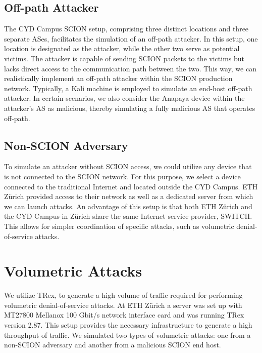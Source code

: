\subsection{Off-path Attacker}

The CYD Campus SCION setup, comprising three distinct locations and three separate ASes, facilitates the simulation of an off-path attacker.
In this setup, one location is designated as the attacker, while the other two serve as potential victims.
The attacker is capable of sending SCION packets to the victims but lacks direct access to the communication path between the two.
This way, we can realistically implement an off-path attacker within the SCION production network.
Typically, a Kali machine is employed to simulate an end-host off-path attacker.
In certain scenarios, we also consider the Anapaya device within the attacker's AS as malicious, thereby simulating a fully malicious AS that operates off-path.

\subsection{Non-SCION Adversary}
To simulate an attacker without SCION access, we could utilize any device that is not connected to the SCION network.
For this purpose, we select a device connected to the traditional Internet and located outside the CYD Campus.
ETH Zürich provided access to their network as well as a dedicated server from which we can launch attacks.
An advantage of this setup is that both ETH Zürich and the CYD Campus in Zürich share the same Internet service provider, SWITCH.
This allows for simpler coordination of specific attacks, such as volumetric denial-of-service attacks.


\section{Volumetric Attacks}
\label{sec:impl:VolumetricDoS}

We utilize TRex, to generate a high volume of traffic required for performing volumetric denial-of-service attacks.
At ETH Zürich a server was set up with MT27800 Mellanox 100 Gbit/s network interface card and was running TRex version 2.87.
This setup provides the necessary infrastructure to generate a high throughput of traffic.
We simulated two types of volumetric attacks: one from a non-SCION adversary and another from a malicious SCION end host.

